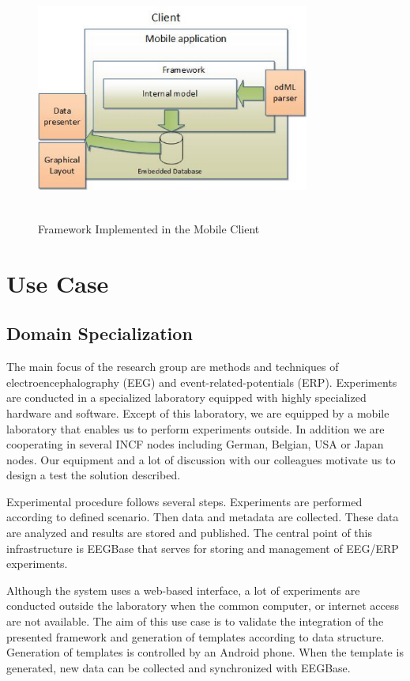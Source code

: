 \documentclass[conference]{IEEEtran}
\begin{document}
\begin{figure}
\centering\includegraphics[width=9cm, height=8cm]{Client}
\caption{\label{client}Framework Implemented in the Mobile Client}

\end{figure}


\section{Use Case}

\subsection{Domain Specialization}

The main focus of the research group are methods and techniques of electroencephalography (EEG) and event-related-potentials (ERP). Experiments are conducted in a specialized laboratory equipped with highly specialized hardware and software. Except of this laboratory, we are equipped by a mobile laboratory that enables us to perform experiments outside. In addition we are cooperating in several INCF nodes including German, Belgian, USA or Japan nodes. Our equipment and a lot of discussion with our colleagues motivate us to design a test the solution described.

Experimental procedure follows several steps.  Experiments are performed according to defined scenario. Then data and metadata are collected. These data are analyzed and results are stored and published. The central point of this infrastructure is EEGBase \cite{DBLP:conf/biostec/JezekSBM13} that serves for storing and management of EEG/ERP experiments.

Although the system uses a web-based interface, a lot of experiments are conducted outside the laboratory when the common computer, or internet access are not available. The aim of this use case is to validate the integration of the presented framework and generation of templates according to data structure. Generation of templates is controlled by an Android phone. When the template is generated, new data can be collected and synchronized with EEGBase.
\end{document}
